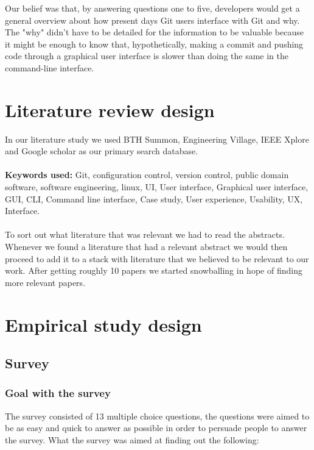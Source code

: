 \documentclass[a4paper,oneside]{bth} %
\begin{document}
			Our belief was that, by answering questions one to five, developers would get a general overview about how present days Git users interface with Git and why. The "why" didn't have to be detailed for the information to be valuable because it might be enough to know that, hypothetically, making a commit and pushing code through a graphical user interface is slower than doing the same in the command-line interface.  
		 
			\section{Literature review design}
			In our literature study we used BTH Summon, Engineering Village, IEEE Xplore and Google scholar as our primary search database.\\\\
			\textbf{Keywords used:} Git, configuration control, version control, public domain software, software engineering, linux, UI, User interface, Graphical user interface, GUI, CLI, Command line interface, Case study, User experience, Usability, UX, Interface.
			\\\\
			To sort out what literature that was relevant we had to read the abstracts.
			Whenever we found a literature that had a relevant abstract we would then proceed to add it to a stack with literature that we believed to be relevant to our work.
			After getting roughly 10 papers we started snowballing in hope of finding more relevant papers.
			
			\section{Empirical study design}
			
				\subsection{Survey}
					\subsubsection*{Goal with the survey}
					The survey consisted of 13 multiple choice questions, the questions were aimed to be as easy and quick to answer as possible in order to persuade people to answer the survey. What the survey was aimed at finding out the following: 
					
\end{document}
